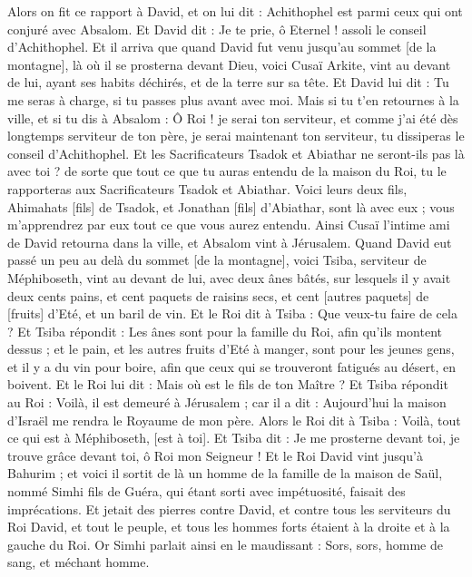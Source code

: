 \begin{multicols}{2}
Alors on fit ce rapport à David, et on lui dit : Achithophel est parmi ceux qui ont conjuré avec Absalom. Et David dit : Je te prie, ô Eternel ! assoli le conseil d'Achithophel.
Et il arriva que quand David fut venu jusqu'au sommet [de la montagne], là où il se prosterna devant Dieu, voici Cusaï Arkite, vint au devant de lui, ayant ses habits déchirés, et de la terre sur sa tête.
Et David lui dit : Tu me seras à charge, si tu passes plus avant avec moi.
Mais si tu t'en retournes à la ville, et si tu dis à Absalom : Ô Roi ! je serai ton serviteur, et comme j'ai été dès longtemps serviteur de ton père, je serai maintenant ton serviteur, tu dissiperas le conseil d'Achithophel.
Et les Sacrificateurs Tsadok et Abiathar ne seront-ils pas là avec toi ? de sorte que tout ce que tu auras entendu de la maison du Roi, tu le rapporteras aux Sacrificateurs Tsadok et Abiathar.
Voici leurs deux fils, Ahimahats [fils] de Tsadok, et Jonathan [fils] d'Abiathar, sont là avec eux ; vous m'apprendrez par eux tout ce que vous aurez entendu.
Ainsi Cusaï l'intime ami de David retourna dans la ville, et Absalom vint à Jérusalem.
\VerseOne{}Quand David eut passé un peu au delà du sommet [de la montagne], voici Tsiba, serviteur de Méphiboseth, vint au devant de lui, avec deux ânes bâtés, sur lesquels il y avait deux cents pains, et cent paquets de raisins secs, et cent [autres paquets] de [fruits] d'Eté, et un baril de vin.
Et le Roi dit à Tsiba : Que veux-tu faire de cela ? Et Tsiba répondit : Les ânes sont pour la famille du Roi, afin qu'ils montent dessus ; et le pain, et les autres fruits d'Eté à manger, sont pour les jeunes gens, et il y a du vin pour boire, afin que ceux qui se trouveront fatigués au désert, en boivent.
Et le Roi lui dit : Mais où est le fils de ton Maître ? Et Tsiba répondit au Roi : Voilà, il est demeuré à Jérusalem ; car il a dit : Aujourd'hui la maison d'Israël me rendra le Royaume de mon père.
Alors le Roi dit à Tsiba : Voilà, tout ce qui est à Méphiboseth, [est à toi]. Et Tsiba dit : Je me prosterne devant toi, je trouve grâce devant toi, ô Roi mon Seigneur !
Et le Roi David vint jusqu'à Bahurim ; et voici il sortit de là un homme de la famille de la maison de Saül, nommé Simhi fils de Guéra, qui étant sorti avec impétuosité, faisait des imprécations.
Et jetait des pierres contre David, et contre tous les serviteurs du Roi David, et tout le peuple, et tous les hommes forts étaient à la droite et à la gauche du Roi.
Or Simhi parlait ainsi en le maudissant : Sors, sors, homme de sang, et méchant homme.

\end{multicols}
